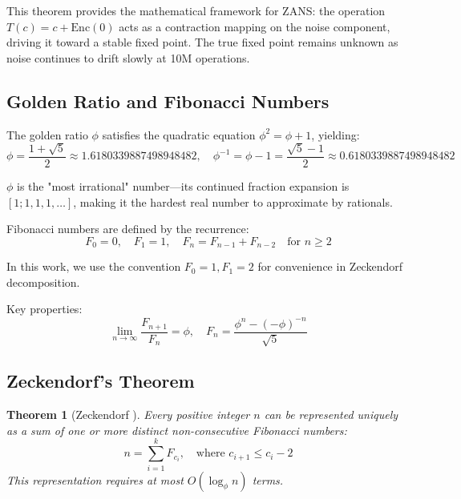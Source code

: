 \documentclass[11pt]{article}
\newtheorem{theorem}{Theorem}
\begin{document}
This theorem provides the mathematical framework for ZANS: the operation $T(c) = c + \text{Enc}(0)$ acts as a contraction mapping on the noise component, driving it toward a stable fixed point. The true fixed point remains unknown as noise continues to drift slowly at 10M operations.

\subsection{Golden Ratio and Fibonacci Numbers}

The golden ratio $\phi$ satisfies the quadratic equation $\phi^2 = \phi + 1$, yielding:
\begin{equation}
\phi = \frac{1 + \sqrt{5}}{2} \approx 1.6180339887498948482, \quad \phi^{-1} = \phi - 1 = \frac{\sqrt{5} - 1}{2} \approx 0.6180339887498948482
\end{equation}

$\phi$ is the "most irrational" number—its continued fraction expansion is $[1; 1, 1, 1, \ldots]$, making it the hardest real number to approximate by rationals.

Fibonacci numbers are defined by the recurrence:
\begin{equation}
F_0 = 0, \quad F_1 = 1, \quad F_n = F_{n-1} + F_{n-2} \quad \text{for } n \geq 2
\end{equation}

In this work, we use the convention $F_0 = 1, F_1 = 2$ for convenience in Zeckendorf decomposition.

Key properties:
\begin{equation}
\lim_{n\to\infty} \frac{F_{n+1}}{F_n} = \phi, \quad F_n = \frac{\phi^n - (-\phi)^{-n}}{\sqrt{5}}
\end{equation}

\subsection{Zeckendorf's Theorem}

\begin{theorem}[Zeckendorf \cite{zeckendorf1972}]
Every positive integer $n$ can be represented uniquely as a sum of one or more distinct non-consecutive Fibonacci numbers:
\begin{equation}
n = \sum_{i=1}^k F_{c_i}, \quad \text{where } c_{i+1} \leq c_i - 2
\end{equation}
This representation requires at most $O(\log_\phi n)$ terms.
\end{theorem}
\end{document}
